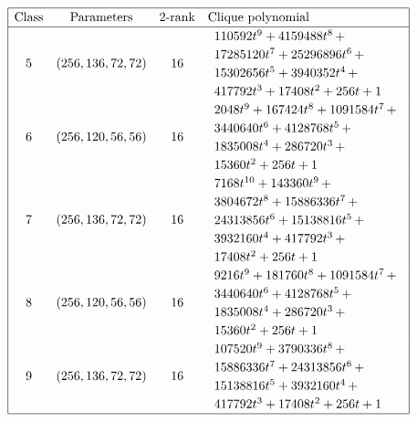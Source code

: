 \documentclass[12pt,a4paper]{article}
\begin{document}
\newpage
\begin{table}[!bhpt] %
\small{}
\begin{align*}
\def\arraystretch{1.2}
\begin{array}{|cccl|}
\hline
\text{Class} &
\text{Parameters} &
\text{2-rank} &
\text{Clique polynomial}
\\
\hline
5 &
(256, 136, 72, 72) &
16 &
\begin{array}{l}
110592t^{9} + 4159488t^{8}
\,+
\\
 17285120t^{7} + 25296896t^{6}
\,+
\\
 15302656t^{5} + 3940352t^{4}
\,+
\\
 417792t^{3} + 17408t^{2} + 256t + 1
\end{array}
\\
6 &
(256, 120, 56, 56) &
16 &
\begin{array}{l}
2048t^{9} + 167424t^{8} + 1091584t^{7}
\,+
\\
 3440640t^{6} + 4128768t^{5}
\,+
\\
 1835008t^{4} + 286720t^{3}
\,+
\\
 15360t^{2} + 256t + 1
\end{array}
\\
7 &
(256, 136, 72, 72) &
16 &
\begin{array}{l}
7168t^{10} + 143360t^{9}
\,+
\\
 3804672t^{8} + 15886336t^{7}
\,+
\\
 24313856t^{6} + 15138816t^{5}
\,+
\\
 3932160t^{4} + 417792t^{3}
\,+
\\
 17408t^{2} + 256t + 1
\end{array}
\\
8 &
(256, 120, 56, 56) &
16 &
\begin{array}{l}
9216t^{9} + 181760t^{8} + 1091584t^{7}
\,+
\\
 3440640t^{6} + 4128768t^{5}
\,+
\\
 1835008t^{4} + 286720t^{3}
\,+
\\
 15360t^{2} + 256t + 1
\end{array}
\\
9 &
(256, 136, 72, 72) &
16 &
\begin{array}{l}
107520t^{9} + 3790336t^{8}
\,+
\\
 15886336t^{7} + 24313856t^{6}
\,+
\\
 15138816t^{5} + 3932160t^{4}
\,+
\\
 417792t^{3} + 17408t^{2} + 256t + 1
\end{array}
\\
\hline
\end{array}
\end{align*}
\caption{$f_{8,10}$ extended Cayley classes (part 2)}
\label{tab-c8_10_EC_classes_2}
\end{table}
\end{document}
